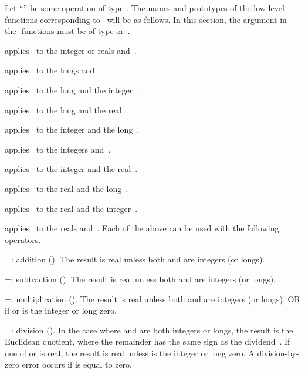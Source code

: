 
\noindent
Let ``\op'' be some operation of type . The names and
prototypes of the low-level functions corresponding to \op\ will be as follows.
In this section, the  argument in the -functions must be of type
 or~.

 applies \op\ to
the integer-or-reals  and~.

 applies \op\ to the longs
 and~.

 applies \op\ to the long 
and the integer~.

 applies \op\ to the long 
and the real~.

 applies \op\ to the
integer  and the long~.

 applies \op\ to the
integers  and~.

 applies \op\ to the
integer  and the real~.

 applies \op\ to the real 
and the long~.

 applies \op\ to the real 
and the integer~.

 applies \op\ to the reals 
and~.
\smallskip
\noindent Each of the above can be used with the following operators.

\op=: addition (). The result is real unless both 
and  are integers (or longs).

\op=: subtraction (). The result is real unless both
 and  are integers (or longs).

\op=: multiplication (). The result is real unless both
 and  are integers (or longs), OR if  or  is the
integer or long zero.

\op=: division (). In the case where  and 
are both integers or longs, the result is the Euclidean quotient, where the
remainder has the same sign as the dividend~. If one of  or
 is real, the result is real unless  is the integer or long
zero. A division-by-zero error occurs if  is equal to zero.


